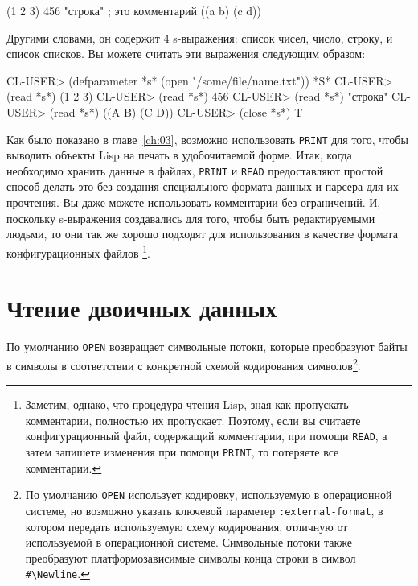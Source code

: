 \begin{myverb}
(1 2 3)
456
"строка" ; это комментарий
((a b)
 (c d))
\end{myverb}

Другими словами, он содержит 4 s-выражения: список чисел, число, строку, и список
списков. Вы можете считать эти выражения следующим образом:

\begin{myverb}
CL-USER> (defparameter *s* (open "/some/file/name.txt"))
*S*
CL-USER> (read *s*)
(1 2 3)
CL-USER> (read *s*)
456
CL-USER> (read *s*)
"строка"
CL-USER> (read *s*)
((A B) (C D))
CL-USER> (close *s*)
T
\end{myverb}

Как было показано в главе~\ref{ch:03}, возможно использовать \lstinline{PRINT} для того, чтобы выводить
объекты Lisp на печать в удобочитаемой форме. Итак, когда необходимо хранить данные в
файлах, \lstinline{PRINT} и \lstinline{READ} предоставляют простой способ делать это без создания
специального формата данных и парсера для их прочтения. Вы даже можете использовать
комментарии без ограничений. И, поскольку s-выражения создавались для того, чтобы быть
редактируемыми людьми, то они так же хорошо подходят для использования в качестве формата
конфигурационных файлов \footnote{Заметим, однако, что процедура чтения Lisp, зная как
  пропускать комментарии, полностью их пропускает. Поэтому, если вы считаете
  конфигурационный файл, содержащий комментарии, при помощи \lstinline{READ}, а затем запишете
  изменения при помощи \lstinline{PRINT}, то потеряете все комментарии.}.

\section{Чтение двоичных данных}

По умолчанию \lstinline{OPEN} возвращает символьные потоки, которые преобразуют байты в символы
в соответствии с конкретной схемой кодирования символов\footnote{По умолчанию \lstinline{OPEN}
  использует кодировку, используемую в операционной системе, но возможно указать ключевой
  параметер \lstinline{:external-format}, в котором передать используемую схему кодирования,
  отличную от используемой в операционной системе. Символьные потоки также преобразуют
  платформозависимые символы конца строки в символ \lstinline!#\Newline!.}.


